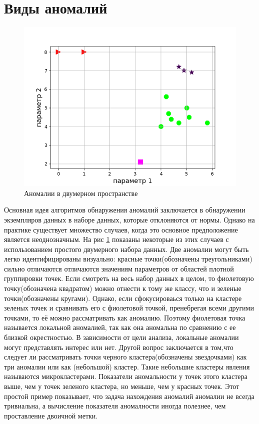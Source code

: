 \section{Виды аномалий}
\begin{figure}
	\centering
	\includegraphics[width=.5\textwidth]{img/1_1.png}
	\caption{Аномалии в двумерном пространстве}
	\label{fig01}
\end{figure}

Основная идея алгоритмов обнаружения аномалий заключается в обнаружении экземпляров данных в наборе данных, которые отклоняются от нормы. Однако на практике существует множество случаев, когда это основное предположение является неоднозначным. На рис \ref{fig01} показаны некоторые из этих случаев с использованием простого двумерного набора данных. Две аномалии могут быть легко идентифицированы визуально: красные  точки(обозначены треугольниками)  сильно отличаются отличаются значениям параметров от областей плотной группировки точек. Если смотреть на весь набор данных в целом, то фиолетовую точку(обозначена квадратом) можно отнести к тому же классу, что и зеленые точки(обозначены кругами).  Однако, если сфокусироваься только на кластере зеленых точек и сравнивать его с фиолетовой точкой, пренебрегая всеми другими точками, то её можно рассматривать как аномалию. Поэтому фиолетовая точка называется локальной аномалией, так как она аномальна по сравнению с ее близкой окрестностью. В зависимости от цели анализа, локальные  аномалии могут представлять интерес или нет. 
Другой  вопрос  заключается в том,что следует ли рассматривать точки черного кластера(обозначены звездочками)  как три аномалии или как (небольшой) кластер. Такие небольшие кластеры явления называются микрокластерами. Показатели аномальности у точек этого кластера выше, чем  у точек зеленого кластера, но меньше, чем  у красных точек. Этот простой пример  показывает, что задача нахождения аномалий аномалии не всегда тривиальна, а вычисление показателя аномалности иногда полезнее, чем проставление двоичной метки.


